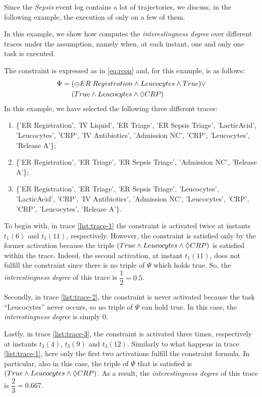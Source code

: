 Since the \textit{Sepsis} event log contains a lot of trajectories, we discuss, in the following example, the execution of \janus only on a few of them.
\begin{example}\label{ex:sepsis-result}
In this example, we show how \janus computes the \textit{interestingness degree} over different traces under the \declare assumption, namely when, at each instant, one and only one task is executed.

The constraint is expressed as in \ref{eq:rcon} and, for this example, is as follows:
\begin{align*}
\Psi = \;& (\Yesterday ER\; Registration \lAND Leucocytes \lAND True) \lOR\\
& (True \lAND Leucocytes \lAND \Diamond CRP)
\end{align*}
In this example, we have selected the following three different traces:
\begin{enumerate}
\item \label{list:trace-1} \{'ER Registration', 'IV Liquid', 'ER Triage', 'ER Sepsis Triage', 'LacticAcid', 'Leucocytes', 'CRP', 'IV Antibiotics', 'Admission NC', 'CRP', 'Leucocytes', 'Release A'\};
\item \label{list:trace-2} \{'ER Registration', 'ER Triage', 'ER Sepsis Triage', 'Admission NC', 'Release A'\};
\item \label{list:trace-3} \{'ER Registration', 'ER Triage', 'ER Sepsis Triage', 'Leucocytes', 'LacticAcid', 'CRP', 'IV Antibiotics', 'Admission NC', 'Leucocytes', 'CRP', 'CRP', 'Leucocytes', 'Release A'\}.
\end{enumerate}
To begin with, in trace \ref{list:trace-1} the constraint is activated twice at instants $t_1(6)$ and $t_1(11)$, respectively. However, the constraint is satisfied only by the former activation because the triple $(True \wedge Leucocytes \wedge \Diamond CRP)$ is satisfied within the trace. Indeed, the second activation, at instant $t_1(11)$, does not fulfill the constraint since there is no triple of $\Psi$ which holds true. So, the \textit{interestingness degree} of this trace is $\dfrac{1}{2} = 0.5$.

Secondly, in trace \ref{list:trace-2}, the constraint is never activated because the task ``Leucocytes'' never occurs, so no triple of $\Psi$ can hold true. In this case, the \textit{interestingness degree} is simply $0$.

Lastly, in trace \ref{list:trace-3}, the constraint is activated three times, respectively at instants $t_3(4)$,  $t_3(9)$ and $t_3(12)$. Similarly to what happens in trace \ref{list:trace-1}, here only the first two activations fulfill the constraint formula. In particular, also in this case, the triple of $\Psi$ that is satisfied is $(True \wedge Leucocytes \wedge \Diamond CRP)$. As a result, the \textit{interestingness degree} of this trace is $\dfrac{2}{3} = 0.667$.
\end{example}

